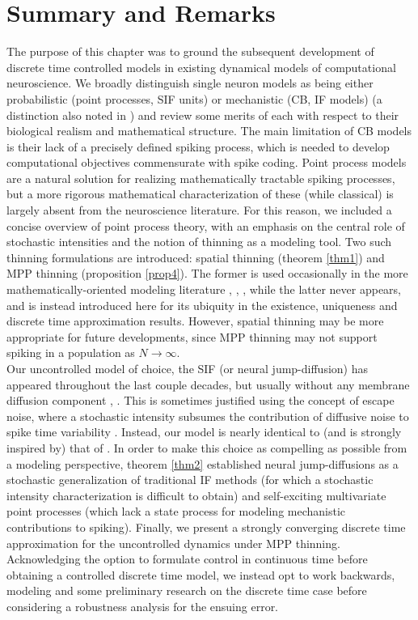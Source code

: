 \documentclass[12pt, oneside]{report}
\newcommand{\1}[1]{\mathbbm{1}_{\{#1\}}}
\theoremstyle{definition}
\begin{document}
\section{Summary and Remarks}
The purpose of this chapter was to ground the subsequent development of discrete
time controlled models in existing dynamical models of computational
neuroscience. We broadly distinguish single neuron models as being either
probabilistic (point processes, SIF units) or mechanistic (CB, IF models) (a
distinction also noted in
\cite{Kass_Amari_Arai_Brown_Diekman_Diesmann_Doiron_Eden_Fairhall_Fiddyment_et_al._2018})
and review some merits of each with respect to their biological realism and mathematical structure.
The main limitation of CB models is their lack of a precisely defined spiking process, which is needed
to develop computational objectives commensurate with spike coding. Point process models are a natural
solution for realizing mathematically tractable spiking processes, but a more rigorous mathematical characterization of these (while classical)
is largely absent from the neuroscience literature. For this reason, we included a concise overview of point process theory, with an emphasis on
the central role of stochastic intensities and the notion of thinning as a modeling tool. Two such thinning formulations are introduced: spatial thinning (theorem \ref{thm1}) and MPP thinning (proposition \ref{prop4}).
The former is used occasionally in the more mathematically-oriented modeling literature \cite{Giraudo_Sacerdote_1997}, \cite{Jahn_Berg_Hounsgaard_Ditlevsen_2011}, \cite{Fournier_Löcherbach_2016}, \cite{Jabin_Schmutz_Zhou_2024}
while the latter never appears, and is instead introduced here for its ubiquity in the existence, uniqueness and discrete time approximation results. However, spatial thinning may be more appropriate for future developments, since MPP thinning may not
support spiking in a population as $N\rightarrow\infty$.\\[5pt]
\indent Our uncontrolled model of choice, the SIF (or neural jump-diffusion) has appeared throughout the last couple decades, but usually without any membrane diffusion component \cite{Cormier_Tanré_Veltz_2021}, \cite{Fournier_Löcherbach_2016}. This is sometimes justified
using the concept of escape noise, where a stochastic intensity subsumes the contribution of diffusive noise to spike time variability \cite{Plesser_Gerstner_2000}. Instead, our model is nearly identical to (and is strongly inspired by) that of \cite{Jabin_Zhou_2023}.
In order to make this choice as compelling as possible from a modeling perspective, theorem \ref{thm2} established neural jump-diffusions as a stochastic generalization of
traditional IF methods (for which a stochastic intensity characterization is difficult to obtain) and self-exciting multivariate point processes (which lack a state process for modeling mechanistic contributions to spiking). Finally, we present a strongly converging discrete time approximation for the uncontrolled dynamics
under MPP thinning. Acknowledging the option to formulate control in continuous time before obtaining a controlled discrete time model, we instead opt to work backwards, modeling and some preliminary research on the discrete time case before considering a robustness analysis for the ensuing error.
\end{document}

